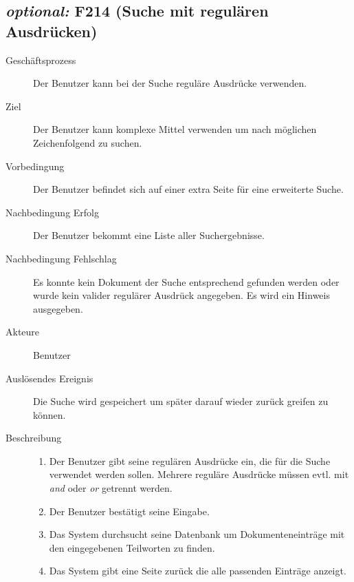 \subsection{\emph{optional:} F214 (Suche mit regulären Ausdrücken)}
\label{F:regexSuche}
\begin{description}
  \item[Geschäftsprozess]Der Benutzer kann bei der Suche reguläre Ausdrücke verwenden.
  \item[Ziel]Der Benutzer kann komplexe Mittel verwenden um nach möglichen Zeichenfolgend zu suchen.
  \item[Vorbedingung]Der Benutzer befindet sich auf einer extra Seite für eine erweiterte Suche.
  \item[Nachbedingung Erfolg]Der Benutzer bekommt eine Liste aller Suchergebnisse.
  \item[Nachbedingung Fehlschlag]Es konnte kein Dokument der Suche entsprechend gefunden werden oder wurde kein valider regulärer Ausdrück angegeben. Es wird ein Hinweis ausgegeben.
  \item[Akteure]Benutzer
  \item[Auslösendes Ereignis]Die Suche wird gespeichert um später darauf wieder zurück greifen zu können.
  \item[Beschreibung]\hfill
    \begin{enumerate}
      \item Der Benutzer gibt seine regulären Ausdrücke ein, die für die Suche verwendet werden sollen. Mehrere reguläre Ausdrücke müssen evtl. mit \emph{and} oder \emph{or} getrennt werden.
      \item Der Benutzer bestätigt seine Eingabe.
      \item Das System durchsucht seine Datenbank um Dokumenteneinträge mit den eingegebenen Teilworten zu finden.
      \item Das System gibt eine Seite zurück die alle passenden Einträge anzeigt.
    \end{enumerate}
\end{description}

